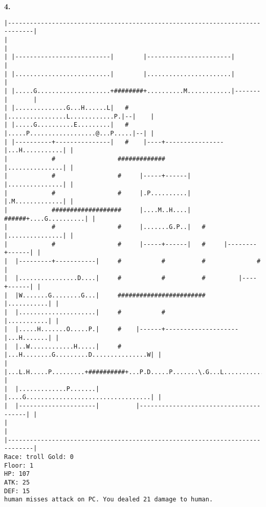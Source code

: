 \documentclass[11pt]{article}
\theoremstyle{plain}
\begin{document}
\newpage
\textbf{4. }
\begin{Verbatim}[fontsize=\scriptsize]
|-----------------------------------------------------------------------------|
|                                                                             |
| |--------------------------|        |-----------------------|               |
| |..........................|        |.......................|               |
| |.....G....................+########+..........M............|-------|       |
| |..............G...H......L|   #    |................L............P.|--|    |
| |.....G..........E.........|   #    |.....P..................@...P.....|--| |
| |----------+---------------|   #    |----+----------------|...H...........| |
|            #                 #############                |...............| |
|            #                 #     |-----+------|         |...............| |
|            #                 #     |.P..........|         |.M.............| |
|            ###################     |....M..H....|   ######+....G..........| |
|            #                 #     |.......G.P..|   #     |...............| |
|            #                 #     |-----+------|   #     |--------+------| |
|  |---------+-----------|     #           #          #              #        |
|  |................D....|     #           #          #         |----+------| |
|  |W.......G........G...|     ########################         |...........| |
|  |.....................|     #           #                    |...........| |
|  |.....H.......O.....P.|     #    |------+--------------------|...H.......| |
|  |..W............H.....|     #    |...H........G.........D...............W| |
|  |...L.H.....P.........+##########+...P.D.....P.......\.G...L.............| |
|  |.............P.......|          |....G..................................| |
|  |---------------------|          |---------------------------------------| |
|                                                                             |
|-----------------------------------------------------------------------------|
Race: troll Gold: 0                                                    Floor: 1
HP: 107
ATK: 25
DEF: 15
human misses attack on PC. You dealed 21 damage to human. 
\end{Verbatim}
\end{document}
